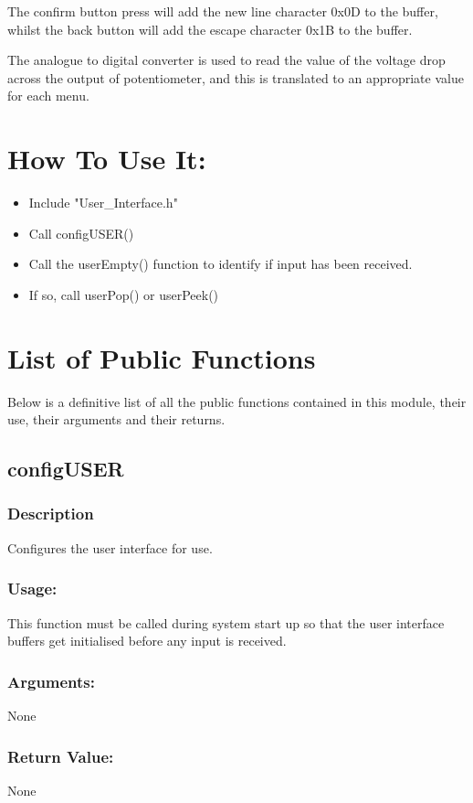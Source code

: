 \documentclass[]{report}
\begin{document}
The confirm button press will add the new line character 0x0D to the buffer, whilst the back button will add the escape character 0x1B to the buffer.

The analogue to digital converter is used to read the value of the voltage drop across the output of potentiometer, and this is translated to an appropriate value for each menu.


\section{How To Use It:}
\begin{itemize}
	\item Include "User\_Interface.h"
	\item Call configUSER()
	\item Call the userEmpty() function to identify if input has been received.
	\item If so, call userPop() or userPeek()
\end{itemize}

\section{List of Public Functions}
Below is a definitive list of all the public functions contained in this module, their use, their arguments and their returns.

\subsection{configUSER}
\subsubsection{Description}
Configures the user interface for use.
\subsubsection{Usage:}
This function must be called during system start up so that the user interface buffers get initialised before any input is received. 

\subsubsection{Arguments:}
None
\subsubsection{Return Value:}
None
\end{document}
